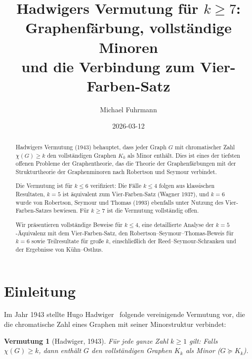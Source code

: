 \documentclass[12pt,a4paper]{amsart}
\newtheorem{vermutung}[theorem]{Vermutung}
\theoremstyle{definition}
\theoremstyle{remark}
\begin{document}
\title{Hadwigers Vermutung für $k \geq 7$:\\
Graphenfärbung, vollständige Minoren\\
und die Verbindung zum Vier-Farben-Satz}

\author{Michael Fuhrmann}
\address{Specialist Mathematics Project, Build 166}
\date{2026-03-12}

\begin{abstract}
Hadwigers Vermutung (1943) behauptet, dass jeder Graph $G$ mit chromatischer
Zahl $\chi(G) \geq k$ den vollständigen Graphen $K_k$ als Minor enthält. Dies
ist eines der tiefsten offenen Probleme der Graphentheorie, das die Theorie der
Graphenfärbungen mit der Strukturtheorie der Graphenminoren nach Robertson und
Seymour verbindet.

Die Vermutung ist für $k \leq 6$ verifiziert: Die Fälle $k \leq 4$ folgen aus
klassischen Resultaten, $k = 5$ ist äquivalent zum Vier-Farben-Satz (Wagner 1937),
und $k = 6$ wurde von Robertson, Seymour und Thomas (1993) ebenfalls unter Nutzung
des Vier-Farben-Satzes bewiesen. Für $k \geq 7$ ist die Vermutung vollständig offen.

Wir präsentieren vollständige Beweise für $k \leq 4$, eine detaillierte Analyse
der $k = 5$-Äquivalenz mit dem Vier-Farben-Satz, den Robertson--Seymour--Thomas-Beweis
für $k = 6$ sowie Teilresultate für große $k$, einschließlich der Reed--Seymour-Schranken
und der Ergebnisse von Kühn--Osthus.
\end{abstract}

\maketitle

\tableofcontents

\section{Einleitung}

Im Jahr 1943 stellte Hugo Hadwiger~\cite{Hadwiger1943} folgende vereinigende Vermutung vor,
die die chromatische Zahl eines Graphen mit seiner Minorstruktur verbindet:

\begin{vermutung}[Hadwiger, 1943]\label{verm:hadwiger}
Für jede ganze Zahl $k \geq 1$ gilt: Falls $\chi(G) \geq k$, dann enthält $G$
den vollständigen Graphen $K_k$ als Minor ($G \succeq K_k$).
\end{vermutung}
\end{document}
